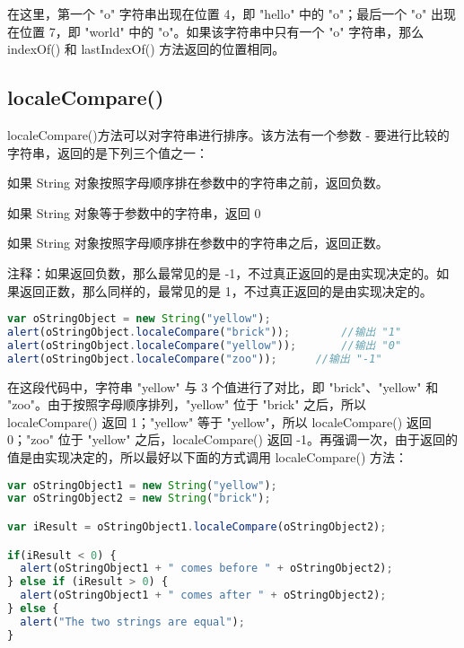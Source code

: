 在这里，第一个 "o" 字符串出现在位置 4，即 "hello" 中的 "o"；最后一个 "o" 出现在位置 7，即 "world" 中的 "o"。如果该字符串中只有一个 "o" 字符串，那么 indexOf() 和 lastIndexOf() 方法返回的位置相同。




\subsection{localeCompare()}



localeCompare()方法可以对字符串进行排序。该方法有一个参数 - 要进行比较的字符串，返回的是下列三个值之一：

\begin{compactitem}
\item 如果 String 对象按照字母顺序排在参数中的字符串之前，返回负数。
\item 如果 String 对象等于参数中的字符串，返回 0
\item 如果 String 对象按照字母顺序排在参数中的字符串之后，返回正数。
\end{compactitem}



注释：如果返回负数，那么最常见的是 -1，不过真正返回的是由实现决定的。如果返回正数，那么同样的，最常见的是 1，不过真正返回的是由实现决定的。


\begin{lstlisting}[language=JavaScript]
var oStringObject = new String("yellow");
alert(oStringObject.localeCompare("brick"));		//输出 "1"
alert(oStringObject.localeCompare("yellow"));		//输出 "0"
alert(oStringObject.localeCompare("zoo"));		//输出 "-1"
\end{lstlisting}


在这段代码中，字符串 "yellow" 与 3 个值进行了对比，即 "brick"、"yellow" 和 "zoo"。由于按照字母顺序排列，"yellow" 位于 "brick" 之后，所以 localeCompare() 返回 1；"yellow" 等于 "yellow"，所以 localeCompare() 返回 0；"zoo" 位于 "yellow" 之后，localeCompare() 返回 -1。再强调一次，由于返回的值是由实现决定的，所以最好以下面的方式调用 localeCompare() 方法：

\begin{lstlisting}[language=JavaScript]
var oStringObject1 = new String("yellow");
var oStringObject2 = new String("brick");

var iResult = oStringObject1.localeCompare(oStringObject2);

if(iResult < 0) {
  alert(oStringObject1 + " comes before " + oStringObject2);
} else if (iResult > 0) {
  alert(oStringObject1 + " comes after " + oStringObject2);
} else {
  alert("The two strings are equal");
}
\end{lstlisting}


